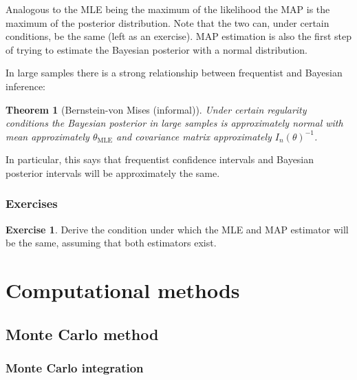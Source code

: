 \documentclass{book}
\theoremstyle{plain}%
\newtheorem{theorem}{Theorem}[section]
\theoremstyle{definition}
\newtheorem{exercise}{Exercise}[chapter]
\begin{document}
Analogous to the MLE being the maximum of the likelihood the MAP is the maximum of the posterior distribution. Note that the two can, under certain conditions, be the same (left as an exercise). MAP estimation is also the first step of trying to estimate the Bayesian posterior with a normal distribution. 

In large samples there is a strong relationship between frequentist and Bayesian inference:

\begin{theorem}[Bernstein-von Mises (informal)] Under certain regularity conditions the Bayesian posterior in large samples is approximately normal with mean approximately $\theta_\text{MLE}$ and covariance matrix approximately $I_n(\theta)^{-1}$.
\end{theorem}

In particular, this says that frequentist confidence intervals and Bayesian posterior intervals will be approximately the same.

\section*{Exercises}

\begin{exercise}
Derive the condition under which the MLE and MAP estimator will be the same, assuming that both estimators exist.
\end{exercise}



%
%



\part{Computational methods}

\chapter{Monte Carlo method}

\section{Monte Carlo integration}
\end{document}
